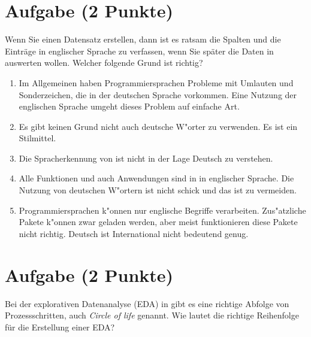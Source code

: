 \documentclass[a4paper, 9pt]{scrartcl}\usepackage[]{graphicx}\usepackage[]{xcolor}
\begin{document}
\section{Aufgabe \hfill (2 Punkte)}

Wenn Sie einen Datensatz erstellen, dann ist es ratsam die Spalten und die
Eintr{\"a}ge in englischer Sprache zu verfassen, wenn Sie sp{\"a}ter die Daten in
\Rlogo auswerten wollen. Welcher folgende Grund ist richtig?



\begin{enumerate}
\item [\textbf{A} \msquare] Im Allgemeinen haben Programmiersprachen Probleme mit Umlauten und Sonderzeichen, die in der deutschen Sprache vorkommen. Eine Nutzung der englischen Sprache umgeht dieses Problem auf einfache Art.
\item [\textbf{B} \msquare] Es gibt keinen Grund nicht auch deutsche W{"o}rter zu verwenden. Es ist ein Stilmittel.
\item [\textbf{C} \msquare] Die Spracherkennung von \Rlogo ist nicht in der Lage Deutsch zu verstehen.
\item [\textbf{D} \msquare] Alle Funktionen und auch Anwendungen sind in \Rlogo in englischer Sprache. Die Nutzung von deutschen W{"o}rtern ist nicht schick und das ist zu vermeiden.
\item [\textbf{E} \msquare] Programmiersprachen k{"o}nnen nur englische Begriffe verarbeiten. Zus{"a}tzliche Pakete k{"o}nnen zwar geladen werden, aber meist funktionieren diese Pakete nicht richtig. Deutsch ist International nicht bedeutend genug.
\end{enumerate}

\section{Aufgabe \hfill (2 Punkte)}

Bei der explorativen Datenanalyse (EDA) in \Rlogo gibt es eine richtige Abfolge von Prozessschritten, auch \textit{Circle of life} genannt. Wie lautet die richtige Reihenfolge f{\"u}r die Erstellung einer EDA?
\end{document}
